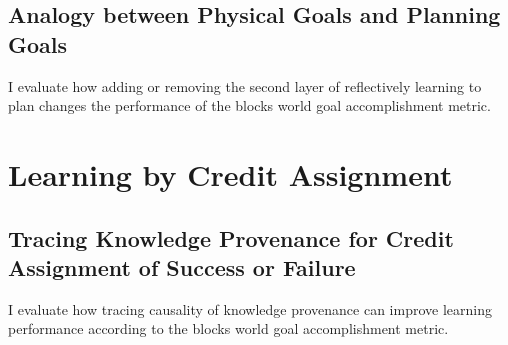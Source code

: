 \subsection{Analogy between Physical Goals and Planning Goals}

I evaluate how adding or removing the second layer of reflectively
learning to plan changes the performance of the blocks world goal
accomplishment metric.

\section{Learning by Credit Assignment}

\subsection{Tracing Knowledge Provenance for Credit Assignment of Success or Failure}

I evaluate how tracing causality of knowledge provenance can improve
learning performance according to the blocks world goal accomplishment
metric.

